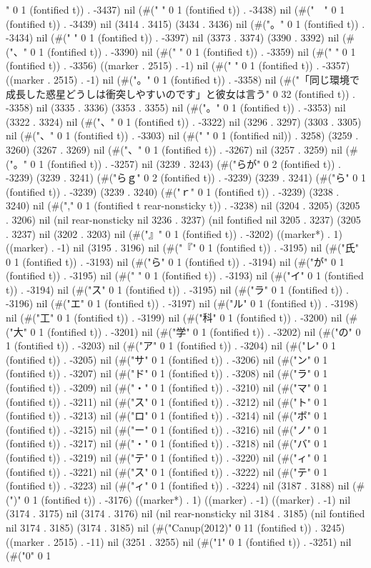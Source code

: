 " 0 1 (fontified t)) . -3437) nil (#("
" 0 1 (fontified t)) . -3438) nil (#("　" 0 1 (fontified t)) . -3439) nil (3414 . 3415) (3434 . 3436) nil (#("。" 0 1 (fontified t)) . -3434) nil (#("
" 0 1 (fontified t)) . -3397) nil (3373 . 3374) (3390 . 3392) nil (#("、" 0 1 (fontified t)) . -3390) nil (#("
" 0 1 (fontified t)) . -3359) nil (#("
" 0 1 (fontified t)) . -3356) ((marker . 2515) . -1) nil (#("
" 0 1 (fontified t)) . -3357) ((marker . 2515) . -1) nil (#("。" 0 1 (fontified t)) . -3358) nil (#("「同じ環境で成長した惑星どうしは衝突しやすいのです」と彼女は言う" 0 32 (fontified t)) . -3358) nil (3335 . 3336) (3353 . 3355) nil (#("。" 0 1 (fontified t)) . -3353) nil (3322 . 3324) nil (#("、" 0 1 (fontified t)) . -3322) nil (3296 . 3297) (3303 . 3305) nil (#("、" 0 1 (fontified t)) . -3303) nil (#(" " 0 1 (fontified nil)) . 3258) (3259 . 3260) (3267 . 3269) nil (#("、" 0 1 (fontified t)) . -3267) nil (3257 . 3259) nil (#("。" 0 1 (fontified t)) . -3257) nil (3239 . 3243) (#("らが" 0 2 (fontified t)) . -3239) (3239 . 3241) (#("らｇ" 0 2 (fontified t)) . -3239) (3239 . 3241) (#("ら" 0 1 (fontified t)) . -3239) (3239 . 3240) (#("ｒ" 0 1 (fontified t)) . -3239) (3238 . 3240) nil (#("," 0 1 (fontified t rear-nonsticky t)) . -3238) nil (3204 . 3205) (3205 . 3206) nil (nil rear-nonsticky nil 3236 . 3237) (nil fontified nil 3205 . 3237) (3205 . 3237) nil (3202 . 3203) nil (#("』" 0 1 (fontified t)) . -3202) ((marker*) . 1) ((marker) . -1) nil (3195 . 3196) nil (#("『" 0 1 (fontified t)) . -3195) nil (#("氏" 0 1 (fontified t)) . -3193) nil (#("ら" 0 1 (fontified t)) . -3194) nil (#("が" 0 1 (fontified t)) . -3195) nil (#(" " 0 1 (fontified t)) . -3193) nil (#("イ" 0 1 (fontified t)) . -3194) nil (#("ス" 0 1 (fontified t)) . -3195) nil (#("ラ" 0 1 (fontified t)) . -3196) nil (#("エ" 0 1 (fontified t)) . -3197) nil (#("ル" 0 1 (fontified t)) . -3198) nil (#("工" 0 1 (fontified t)) . -3199) nil (#("科" 0 1 (fontified t)) . -3200) nil (#("大" 0 1 (fontified t)) . -3201) nil (#("学" 0 1 (fontified t)) . -3202) nil (#("の" 0 1 (fontified t)) . -3203) nil (#("ア" 0 1 (fontified t)) . -3204) nil (#("レ" 0 1 (fontified t)) . -3205) nil (#("サ" 0 1 (fontified t)) . -3206) nil (#("ン" 0 1 (fontified t)) . -3207) nil (#("ド" 0 1 (fontified t)) . -3208) nil (#("ラ" 0 1 (fontified t)) . -3209) nil (#("・" 0 1 (fontified t)) . -3210) nil (#("マ" 0 1 (fontified t)) . -3211) nil (#("ス" 0 1 (fontified t)) . -3212) nil (#("ト" 0 1 (fontified t)) . -3213) nil (#("ロ" 0 1 (fontified t)) . -3214) nil (#("ボ" 0 1 (fontified t)) . -3215) nil (#("ー" 0 1 (fontified t)) . -3216) nil (#("ノ" 0 1 (fontified t)) . -3217) nil (#("・" 0 1 (fontified t)) . -3218) nil (#("バ" 0 1 (fontified t)) . -3219) nil (#("テ" 0 1 (fontified t)) . -3220) nil (#("ィ" 0 1 (fontified t)) . -3221) nil (#("ス" 0 1 (fontified t)) . -3222) nil (#("テ" 0 1 (fontified t)) . -3223) nil (#("ィ" 0 1 (fontified t)) . -3224) nil (3187 . 3188) nil (#(")" 0 1 (fontified t)) . -3176) ((marker*) . 1) ((marker) . -1) ((marker) . -1) nil (3174 . 3175) nil (3174 . 3176) nil (nil rear-nonsticky nil 3184 . 3185) (nil fontified nil 3174 . 3185) (3174 . 3185) nil (#("Canup(2012)" 0 11 (fontified t)) . 3245) ((marker . 2515) . -11) nil (3251 . 3255) nil (#("1" 0 1 (fontified t)) . -3251) nil (#("0" 0 1 